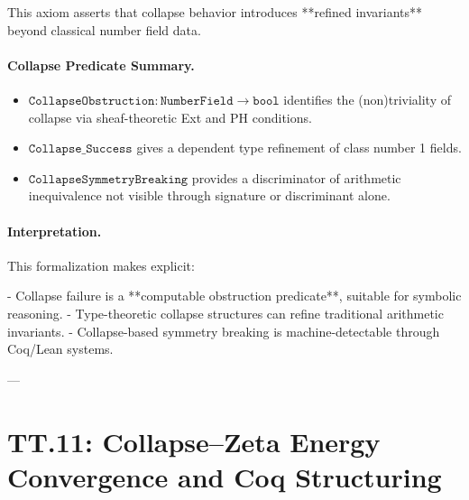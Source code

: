 \documentclass[11pt]{article}
\begin{document}
{This axiom asserts that collapse behavior introduces **refined invariants** beyond classical number field data.

\paragraph{Collapse Predicate Summary.}

\begin{itemize}
  \item \( \texttt{CollapseObstruction} : \texttt{NumberField} \to \texttt{bool} \)  
  identifies the (non)triviality of collapse via sheaf-theoretic Ext and PH conditions.
  
  \item \( \texttt{Collapse_Success} \) gives a dependent type refinement of class number 1 fields.
  
  \item \( \texttt{CollapseSymmetryBreaking} \) provides a discriminator of arithmetic inequivalence  
  not visible through signature or discriminant alone.
\end{itemize}

\paragraph{Interpretation.}

This formalization makes explicit:

- Collapse failure is a **computable obstruction predicate**, suitable for symbolic reasoning.
- Type-theoretic collapse structures can refine traditional arithmetic invariants.
- Collapse-based symmetry breaking is machine-detectable through Coq/Lean systems.

\begin{center}
\end{center}

---

\section*{TT.11: Collapse–Zeta Energy Convergence and Coq Structuring}

}
\end{document}
